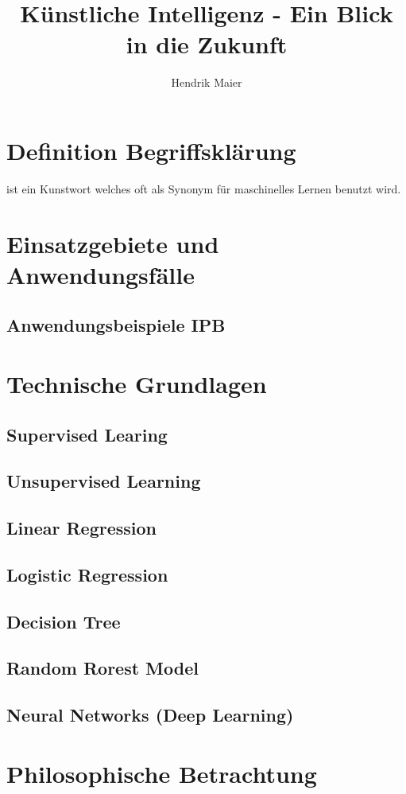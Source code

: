 \documentclass[12pt]{report}
\title{Künstliche Intelligenz - Ein Blick in die Zukunft}
\author{Hendrik Maier}
\date{}
\begin{document}
    \maketitle

    \tableofcontents
    \newpage

    \section{Definition Begriffsklärung}
     ist ein Kunstwort welches oft als Synonym für
    maschinelles Lernen benutzt wird.
    \section{Einsatzgebiete und Anwendungsfälle}
    \subsection{Anwendungsbeispiele IPB}
    \section{Technische Grundlagen}
    \subsection{Supervised Learing}
    \subsection{Unsupervised Learning}
    \subsection{Linear Regression}
    \subsection{Logistic Regression}
    \subsection{Decision Tree}
    \subsection{Random Rorest Model}
    \subsection{Neural Networks (Deep Learning)}
    \section{Philosophische Betrachtung}
\end{document}
